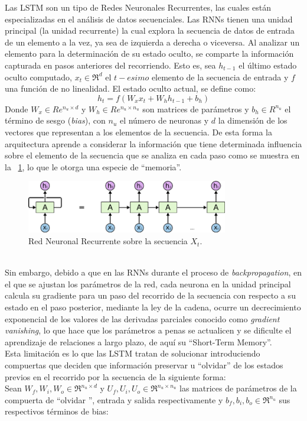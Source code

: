 	Las LSTM son un tipo de Redes Neuronales Recurrentes, las cuales están especializadas en el análisis de datos secuenciales. 
	Las RNNs tienen una unidad principal (la unidad recurrente) la cual explora la secuencia de datos de entrada de un elemento a la vez, ya sea de izquierda a derecha o viceversa. Al analizar un elemento para la determinación de su estado oculto, se comparte la información capturada en pasos anteriores del recorriendo. Esto es, sea $h_{t-1}$ el último estado oculto computado, $x_t \in \Re^d$ el $t-esimo$ elemento de la secuencia de entrada y $f$ una función de no linealidad. El estado oculto actual, se define como:
	\begin{equation}
		h_t = f(W_xx_t + W_hh_{t-1} + b_h)
		\label{rrn_form}
	\end{equation}
	Donde $W_x \in Re^{n_u\times d}$ y $W_h \in Re^{n_u\times n_u}$ son matrices de parámetros y $b_h \in R^{n_u}$ el término de sesgo (\textit{bias}), con $n_u$ el número de neuronas y $d$ la dimensión de los vectores que representan a los elementos de la secuencia.
	De esta forma la arquitectura aprende a considerar la información que tiene determinada influencia sobre el elemento de la secuencia que se analiza en cada paso como se muestra en la \figurename~\ref{rnn}, lo que le otorga una especie de ``memoria''.
	\begin{figure}[!thb]
		\begin{center}
			\includegraphics[width=250pt]{images/rnn.png}
		\end{center}
		\caption[Red Neuronal Recurrente]{Red Neuronal Recurrente sobre la secuencia $X_t$. \citep{agarwala2017music}}
		\label{rnn}
	\end{figure}
	\\
	Sin embargo, debido a que en las RNNs durante el proceso de \textit{backpropagation}, en el que se ajustan los parámetros de la red, cada neurona en la unidad principal calcula su gradiente para un paso del recorrido de la secuencia con respecto a su estado en el paso posterior, mediante la ley de la cadena, ocurre un decrecimiento exponencial de los valores de las derivadas parciales conocido como \textit{gradient vanishing}, lo que hace que los parámetros a penas se actualicen y se dificulte el aprendizaje de relaciones a largo plazo, de aquí su ``Short-Term Memory''.
	\\
	Esta limitación es lo que las LSTM tratan de solucionar introduciendo compuertas que deciden que información preservar u ``olvidar'' de los estados previos en el recorrido por la secuencia de la siguiente forma:
	\\
	Sean $W_f, W_i, W_o \in \Re^{n_u\times d}$ y $U_f, U_i, U_o \in \Re^{n_u\times n_u}$ las matrices de parámetros de la compuerta de ``olvidar '', entrada y salida respectivamente y $b_f, b_i, b_o \in \Re^{n_u}$ sus respectivos términos de bias:
	
